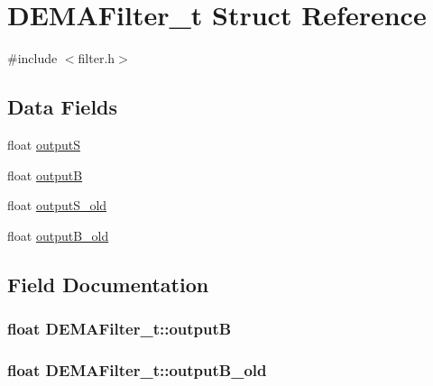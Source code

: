 \hypertarget{struct_d_e_m_a_filter__t}{}\section{D\+E\+M\+A\+Filter\+\_\+t Struct Reference}
\label{struct_d_e_m_a_filter__t}


{\ttfamily \#include $<$filter.\+h$>$}

\subsection*{Data Fields}
\begin{DoxyCompactItemize}
\item 
float \hyperlink{struct_d_e_m_a_filter__t_a7186031f6e4eff42efc07d00ef4873f2}{outputS}
\item 
float \hyperlink{struct_d_e_m_a_filter__t_a299e96d05d78826ea1125f86acdbd642}{outputB}
\item 
float \hyperlink{struct_d_e_m_a_filter__t_a55e36118f319088c742f321f1af24251}{output\+S\+\_\+old}
\item 
float \hyperlink{struct_d_e_m_a_filter__t_a6df84352ea2d972b677f14cce4a95d87}{output\+B\+\_\+old}
\end{DoxyCompactItemize}


\subsection{Field Documentation}
\subsubsection[{\texorpdfstring{outputB}{outputB}}]{\setlength{\rightskip}{0pt plus 5cm}float D\+E\+M\+A\+Filter\+\_\+t\+::outputB}\hypertarget{struct_d_e_m_a_filter__t_a299e96d05d78826ea1125f86acdbd642}{}\label{struct_d_e_m_a_filter__t_a299e96d05d78826ea1125f86acdbd642}
\subsubsection[{\texorpdfstring{output\+B\+\_\+old}{outputB_old}}]{\setlength{\rightskip}{0pt plus 5cm}float D\+E\+M\+A\+Filter\+\_\+t\+::output\+B\+\_\+old}\hypertarget{struct_d_e_m_a_filter__t_a6df84352ea2d972b677f14cce4a95d87}{}\label{struct_d_e_m_a_filter__t_a6df84352ea2d972b677f14cce4a95d87}

